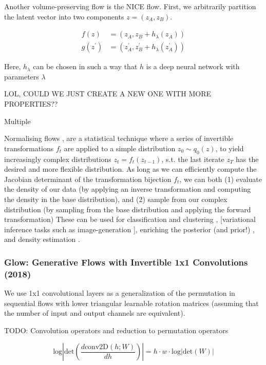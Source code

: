 \documentclass[a4paper,12pt,twoside,openright]{report}
\begin{document}
Another volume-preserving flow is the NICE flow.
First, we arbitrarily partition the latent vector into two components $z = (z_A, z_B)$.

\begin{align}
f(z)  &= (z_A, z_B + h_\lambda(z_A) ) \\
g(z^\prime) &= (z^\prime_A, z^\prime_B + h_\lambda(z^\prime_A) )
\end{align}

Here, $h_\lambda$ can be chosen in such a way that $h$ is a deep neural network with parameters $\lambda$

LOL, COULD WE JUST CREATE A NEW ONE WITH MORE PROPERTIES??


Multiple

Normalising flows \cite{variational_inference_using_normalized_flows}, \cite{normalising_flows} 
are a statistical technique where a series of invertible transformations $f_t$ are applied to a simple distribution $z_0 \sim q_0(z)$, to yield increasingly complex distributions $z_t = f_t(z_{t-1})$, s.t. the last iterate $z_T$ has the desired and more flexible distribution.
As long as we can efficiently compute the Jacobian determinant of the transformation bijection $f_t$, we can both (1) evaluate the density of our data (by applying an inverse transformation and computing the density in the base distribution), and 
(2) sample from our complex distribution (by sampling from the base distribution and applying the forward transformation)
These can be used for classification and clustering \cite{normalising_flows},  [variational inference tasks \cite{iaf} such as image-generation \cite{nvp}], enriching the posterior (and prior!) \cite{variational_inference_using_normalized_flows}, and density estimation \cite{glow}.

\subsubsection{Glow: Generative Flows with Invertible 1x1 Convolutions (2018)}

We use 1x1 convolutional layers as a generalization of the permutation in sequential flows with lower triangular learnable rotation matrices (assuming that the number of input and output channels are equivalent). 

TODO: Convolution operators and reduction to permutation operators

\begin{equation}
\text{log} \left| \text{det} \left( \frac{d \text{conv2D}(h; W) }{dh} \right) \right| = h  \cdot  w \cdot \text{log} | \text{det} (W)  |
\end{equation}
\end{document}
